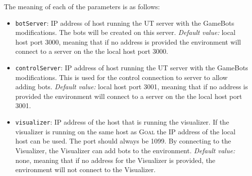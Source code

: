 \documentclass[11pt,a4paper]{article}
\newcommand{\Goal}{\textsc{Goal}}
\begin{document}
\noindent The meaning of each of the parameters is as follows:
\begin{itemize}

	\item \texttt{botServer}: IP address of host running the UT server with the GameBots modifications. The bots will be created on this server. \textit{Default value:} local host port 3000, meaning that if no address is provided the environment will connect to a server on the the local host port 3000.
	\item \texttt{controlServer}: IP address of host running the UT server with the GameBots modifications. This is used for the control connection to server to allow adding bots. \textit{Default value:} local host port 3001, meaning that if no address is provided the environment will connect to a server on the the local host port 3001.
	\item \texttt{visualizer}: IP address of the host that is running the visualizer. If the visualizer is running on the same host as {\Goal} the IP address of the local host can be used. The port should always be 1099. By connecting to the Visualizer, the Visualizer can add bots to the environment. \textit{Default value:} none, meaning that if no address for the Visualizer is provided, the environment will not connect to the Visualizer.


\end{itemize}
\end{document}
